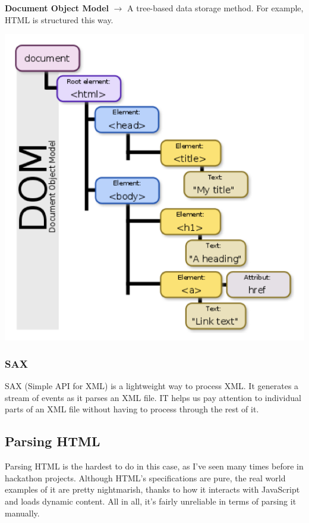 \documentclass[english, 10pt]{article}
\begin{document}
\begin{tcolorbox}[title=Definition:,colframe=red!75!black,colback=red!5!white,arc=0pt,fonttitle=\bfseries]
\textbf{Document Object Model} $\rightarrow$ A tree-based data storage method. For example, HTML is structured this way.
\end{tcolorbox}
\begin{center}
	\includegraphics[scale=0.35]{img/DOM-Tree.png}
\end{center}
\subsubsection{SAX}

SAX (Simple API for XML) is a lightweight way to process XML. It generates a stream of events as it parses an XML file. IT helps us pay attention to individual parts of an XML file without having to process through the rest of it.

\subsection{Parsing HTML}

Parsing HTML is the hardest to do in this case, as I've seen many times before in hackathon projects. Although HTML's specifications are pure, the real world examples of it are pretty nightmarish, thanks to how it interacts with JavaScript and loads dynamic content. All in all, it's fairly unreliable in terms of parsing it manually.\newline
\end{document}
